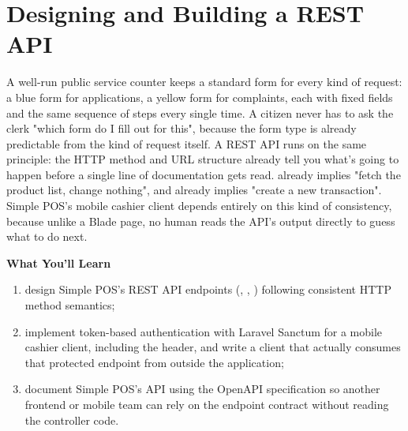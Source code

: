 
\chapter{Designing and Building a REST API}
\label{ch:membangun-rest-api}


A well-run public service counter keeps a standard form for every kind
of request: a blue form for applications, a yellow form for complaints,
each with fixed fields and the same sequence of steps every single
time. A citizen never has to ask the clerk "which form do I fill out
for this", because the form type is already predictable from the kind
of request itself. A REST API runs on the same principle: the HTTP
method and URL structure already tell you what's going to happen before
a single line of documentation gets read. 
already implies "fetch the product list, change nothing", and
 already implies "create a new
transaction". Simple POS's mobile cashier client depends entirely on
this kind of consistency, because unlike a Blade page, no human reads
the API's output directly to guess what to do next.

\textbf{What You'll Learn}

\begin{enumerate}
  \item design Simple POS's REST API endpoints (, , ) following consistent HTTP method semantics;
  \item implement token-based authentication with Laravel Sanctum for a mobile cashier client, including the  header, and write a client that actually consumes that protected endpoint from outside the application;
  \item document Simple POS's API using the OpenAPI specification so another frontend or mobile team can rely on the endpoint contract without reading the controller code.
\end{enumerate}

